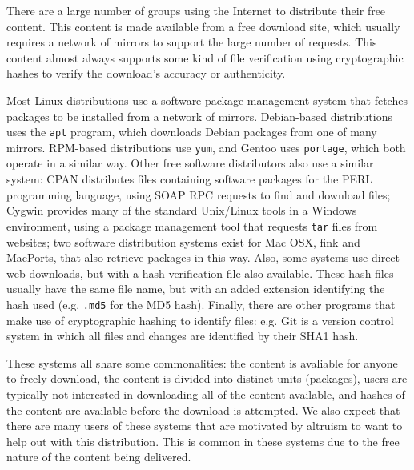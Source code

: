 \documentclass{sig-alt-release2}
\begin{document}
There are a large number of groups using the Internet to distribute
their free content. This content is made available from a free
download site, which usually requires a network of mirrors to
support the large number of requests. This content almost always
supports some kind of file verification using cryptographic hashes
to verify the download's accuracy or authenticity.

Most Linux distributions use a software package management system
that fetches packages to be installed from a network of mirrors.
Debian-based distributions uses the \texttt{apt} program, which
downloads Debian packages from one of many mirrors. RPM-based
distributions use \texttt{yum}, and Gentoo uses \texttt{portage},
which both operate in a similar way. Other free software
distributors also use a similar system: CPAN distributes files
containing software packages for the PERL programming language,
using SOAP RPC requests to find and download files; Cygwin provides
many of the standard Unix/Linux tools in a Windows environment,
using a package management tool that requests \texttt{tar} files from
websites; two software distribution systems exist for Mac OSX,
fink and MacPorts, that also retrieve packages in this way. Also,
some systems use direct web downloads, but with a hash verification
file also available. These
hash files usually have the same file name, but with an added
extension identifying the hash used (e.g. \texttt{.md5} for the MD5
hash). Finally, there are other programs that make use of
cryptographic hashing to identify files: e.g. Git is a version
control system in which all files and changes are identified by
their SHA1 hash.

These systems all share some commonalities: the content is avaliable
for anyone to freely download, the content is divided into distinct
units (packages), users are typically not interested in downloading
all of the content available, and hashes of the content are
available before the download is attempted. We also expect that
there are many users of these systems that are motivated by
altruism to want to help out with this distribution. This is common
in these systems due to the free nature of the content being
delivered.

\end{document}

